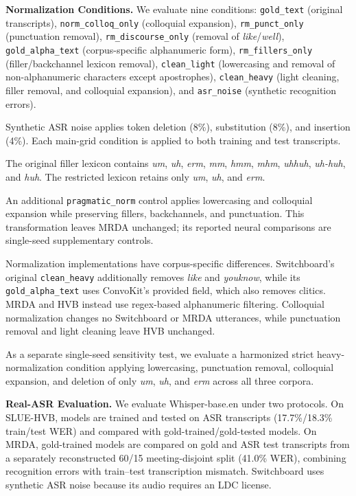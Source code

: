 \documentclass[conference]{IEEEtran}
\begin{document}
\textbf{Normalization Conditions.}
We evaluate nine conditions:
\texttt{gold\_text} (original transcripts),
\texttt{norm\_colloq\_only} (colloquial expansion),
\texttt{rm\_punct\_only} (punctuation removal),
\texttt{rm\_discourse\_only} (removal of
\textit{like}/\textit{well}),
\texttt{gold\_alpha\_text} (corpus-specific alphanumeric form),
\texttt{rm\_fillers\_only} (filler/backchannel lexicon removal),
\texttt{clean\_light} (lowercasing and removal
of non-alphanumeric characters except apostrophes),
\texttt{clean\_heavy} (light cleaning, filler
removal, and colloquial expansion), and
\texttt{asr\_noise} (synthetic recognition errors).

Synthetic ASR noise applies token deletion (8\%),
substitution (8\%), and insertion (4\%).
Each main-grid condition is applied to both
training and test transcripts.

The original filler lexicon contains
\textit{um}, \textit{uh}, \textit{erm},
\textit{mm}, \textit{hmm}, \textit{mhm},
\textit{uhhuh}, \textit{uh-huh}, and
\textit{huh}. The restricted lexicon retains
only \textit{um}, \textit{uh}, and \textit{erm}.

An additional \texttt{pragmatic\_norm} control
applies lowercasing and colloquial expansion
while preserving fillers, backchannels, and
punctuation. This transformation leaves MRDA
unchanged; its reported neural comparisons
are single-seed supplementary controls.

Normalization implementations have corpus-specific
differences. Switchboard's original
\texttt{clean\_heavy} additionally removes
\textit{like} and \textit{youknow}, while its \texttt{gold\_alpha\_text}
uses ConvoKit's provided field, which also removes
clitics. MRDA and HVB instead use regex-based
alphanumeric filtering. Colloquial normalization
changes no Switchboard or MRDA utterances, while
punctuation removal and light cleaning leave HVB
unchanged.

As a separate single-seed sensitivity test, we
evaluate a harmonized strict heavy-normalization
condition applying
lowercasing, punctuation removal, colloquial
expansion, and deletion of only \textit{um},
\textit{uh}, and \textit{erm} across all
three corpora.

\textbf{Real-ASR Evaluation.}
We evaluate Whisper-base.en
\cite{radford-et-al2022-whisper} under two protocols.
On SLUE-HVB, models are trained and tested on
ASR transcripts (17.7\%/18.3\% train/test WER)
and compared with gold-trained/gold-tested models.
On MRDA, gold-trained models are compared on
gold and ASR test transcripts from a separately
reconstructed 60/15 meeting-disjoint split
(41.0\% WER), combining recognition errors
with train--test transcription mismatch.
Switchboard uses synthetic ASR noise because
its audio requires an LDC license.
\end{document}
